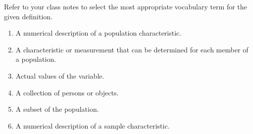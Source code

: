 \documentclass{ximera}
\begin{document}
\begin{problem}\label{prob:140hom1prob4}
Refer to your class notes to select the most appropriate vocabulary term for the given definition.
\begin{enumerate}
    \item A numerical description of a population characteristic.
    \begin{multipleChoice}  
\end{multipleChoice}  
\item A characteristic or measurement that can be determined for each member of a population.
    \begin{multipleChoice}  
\end{multipleChoice}  

\item Actual values of the variable.
    \begin{multipleChoice}  
\end{multipleChoice}  

\item A collection of persons or objects.
    \begin{multipleChoice}  
\end{multipleChoice}  

\item A subset of the population.
    \begin{multipleChoice}  
\end{multipleChoice}

\item A numerical description of a sample characteristic.
    \begin{multipleChoice}  
\end{multipleChoice}
\end{enumerate}
\end{problem}
\end{document}
